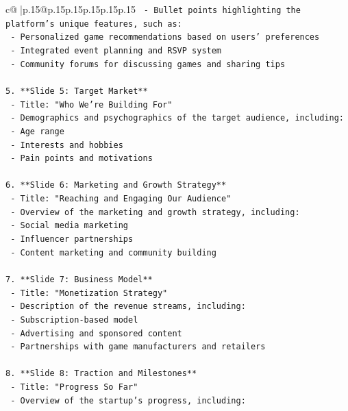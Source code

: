 \documentclass{article}
\begin{document}
{\begin{supertabular}{c@{$\;$}|p{.15\linewidth}@{}p{.15\linewidth}p{.15\linewidth}p{.15\linewidth}p{.15\linewidth}p{.15\linewidth}}
{{{\texttt{   {-} Bullet points highlighting the platform's unique features, such as:} \\
\texttt{     {-} Personalized game recommendations based on users' preferences} \\
\texttt{     {-} Integrated event planning and RSVP system} \\
\texttt{     {-} Community forums for discussing games and sharing tips} \\
\\ 
\texttt{5. **Slide 5: Target Market**} \\
\texttt{   {-} Title: "Who We're Building For"} \\
\texttt{   {-} Demographics and psychographics of the target audience, including:} \\
\texttt{     {-} Age range} \\
\texttt{     {-} Interests and hobbies} \\
\texttt{     {-} Pain points and motivations} \\
\\ 
\texttt{6. **Slide 6: Marketing and Growth Strategy**} \\
\texttt{   {-} Title: "Reaching and Engaging Our Audience"} \\
\texttt{   {-} Overview of the marketing and growth strategy, including:} \\
\texttt{     {-} Social media marketing} \\
\texttt{     {-} Influencer partnerships} \\
\texttt{     {-} Content marketing and community building} \\
\\ 
\texttt{7. **Slide 7: Business Model**} \\
\texttt{   {-} Title: "Monetization Strategy"} \\
\texttt{   {-} Description of the revenue streams, including:} \\
\texttt{     {-} Subscription{-}based model} \\
\texttt{     {-} Advertising and sponsored content} \\
\texttt{     {-} Partnerships with game manufacturers and retailers} \\
\\ 
\texttt{8. **Slide 8: Traction and Milestones**} \\
\texttt{   {-} Title: "Progress So Far"} \\
\texttt{   {-} Overview of the startup's progress, including:} \\
}}}
\end{supertabular}}
\end{document}
